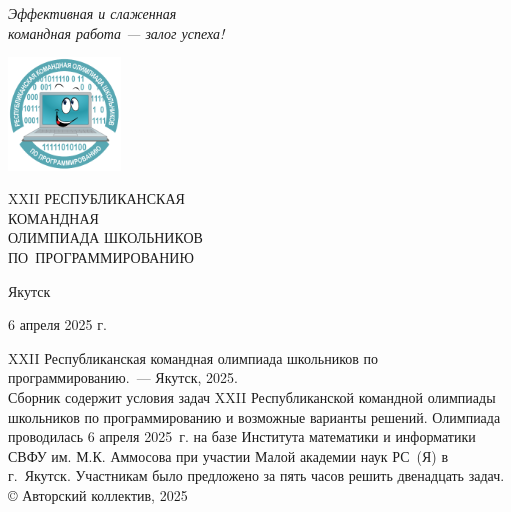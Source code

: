 \documentclass[a5paper, twoside, 11pt]{article}
\begin{document}
\pagestyle{empty}

\begin{flushright} \it
  Эффективная и слаженная \\
  командная работа --- залог успеха!
\end{flushright}
\vskip -15mm
\includegraphics[width=3cm,height=3cm]{figures/logo.pdf}
\\[3cm]
\begin{center}
\huge
XXII РЕСПУБЛИКАНСКАЯ\\КОМАНДНАЯ\\ОЛИМПИАДА ШКОЛЬНИКОВ\\
ПО~ПРОГРАММИРОВАНИЮ
\end{center}
\vfill
\centerline{Якутск}
\centerline{6 апреля 2025 г.}

\newpage
\noindent XXII Республиканская командная олимпиада школьников по программированию.~--- Якутск, 2025.
\\[5mm]
Сборник содержит условия задач XXII Республиканской командной олимпиады школьников по программированию и возможные варианты решений. Олимпиада проводилась 6 апреля 2025~г. на базе Института математики и информатики СВФУ им. М.К. Аммосова при участии Малой академии наук РС~(Я) в г.~Якутск. Участникам было предложено за пять часов решить двенадцать задач.
\vfill
\hfill © Авторский коллектив, 2025
\end{document}
